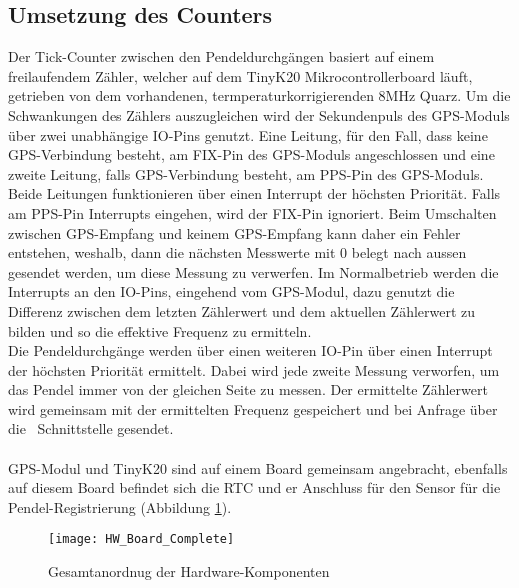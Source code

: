 \subsection{Umsetzung des Counters} %
Der Tick-Counter zwischen den Pendeldurchgängen basiert auf einem freilaufendem Zähler, welcher auf dem TinyK20 Mikrocontrollerboard läuft, getrieben von dem vorhandenen, termperaturkorrigierenden 8MHz Quarz.
Um die Schwankungen des Zählers auszugleichen wird der Sekundenpuls des GPS-Moduls über zwei unabhängige IO-Pins genutzt. Eine Leitung, für den Fall, dass keine GPS-Verbindung besteht, am FIX-Pin des GPS-Moduls angeschlossen und eine zweite Leitung, falls GPS-Verbindung besteht, am PPS-Pin des GPS-Moduls.\\
Beide Leitungen funktionieren über einen Interrupt der höchsten Priorität. Falls am PPS-Pin Interrupts eingehen, wird der FIX-Pin ignoriert. Beim Umschalten zwischen GPS-Empfang und keinem GPS-Empfang kann daher ein Fehler entstehen, weshalb, dann die nächsten Messwerte mit 0 belegt nach aussen gesendet werden, um diese Messung zu verwerfen.
Im Normalbetrieb werden die Interrupts an den IO-Pins, eingehend vom GPS-Modul, dazu genutzt die Differenz zwischen dem letzten Zählerwert und dem aktuellen Zählerwert zu bilden und so die effektive Frequenz zu ermitteln.\\ 
Die Pendeldurchgänge werden über einen weiteren IO-Pin über einen Interrupt der höchsten Priorität ermittelt. Dabei wird jede zweite Messung verworfen, um das Pendel immer von der gleichen Seite zu messen. Der ermittelte Zählerwert wird gemeinsam mit der ermittelten Frequenz gespeichert und bei Anfrage über die \iic\ Schnittstelle gesendet.\\
\\
GPS-Modul und TinyK20 sind auf einem Board gemeinsam angebracht, ebenfalls auf diesem Board befindet sich die RTC und er Anschluss für den Sensor für die Pendel-Registrierung (Abbildung \ref{fig:hardware_board}).
	\begin{figure}[H]
		\centering
		\texttt{[image: HW\_Board\_Complete]}
		\caption{Gesamtanordnug der Hardware-Komponenten}
		\label{fig:hardware_board}
	\end{figure}